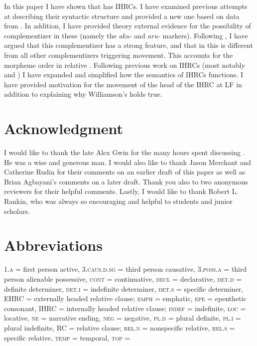 \documentclass[output=paper]{LSP/langsci}
\begin{document}
In this paper I have shown that  has IHRCs. I have examined previous attempts at describing their syntactic structure and provided a new one based on data from . In addition, I have provided theory external evidence for the possibility of complementizer in these  (namely the \textit{aku-} and \textit{aru-} markers). Following \citet{Culy1990}, I have argued that this complementizer has a strong feature, and that in  this is different from all other complementizers triggering movement. This accounts for the morpheme order in  relative .  Following previous work on IHRCs (most notably \citealt{Williamson1987} and \citealt{Culy1990}) I have expanded and simplified how the semantics of IHRCs functions. I have provided motivation for the movement of the head of the IHRC at LF in addition to explaining why Williamson's  holds true.

\section*{Acknowledgment}

I would like to thank the late Alex Gwin for the many hours spent discussing . He was a wise and generous man. I would also like to thank Jason Merchant and Catherine Rudin for their comments on an earlier draft of this paper as well as Brian Agbayani's comments on a later draft. Thank you also to two anonymous reviewers for their helpful comments. Lastly, I would like to thank Robert L. Rankin, who was always so encouraging and helpful to students and junior scholars.

\section*{Abbreviations}

\textsc{1.a} = first person active, \textsc{3.caus.d.sg} = third person causative, \textsc{3.poss.a} = third person alienable possessive, \textsc{cont} = continuative, \textsc{decl} = declarative, \textsc{det.d} = definite determiner, \textsc{det.i} = indefinite determiner, \textsc{det.s} = specific determiner, EHRC = externally headed relative clause; \textsc{emph} = emphatic, \textsc{epe} = epenthetic consonant, IHRC = internally headed relative clause; \textsc{indef} = indefinite, \textsc{loc} = locative, \textsc{ne} = narrative ending, \textsc{neg} = negative, \textsc{pl.d} = plural definite, \textsc{pl.i} = plural indefinite, RC = relative clause; \textsc{rel.n} = nonspecific relative, \textsc{rel.s} = specific relative, \textsc{temp} = temporal, \textsc{top} = 

\printbibliography[heading=subbibliography,notkeyword=this]
\end{document}
